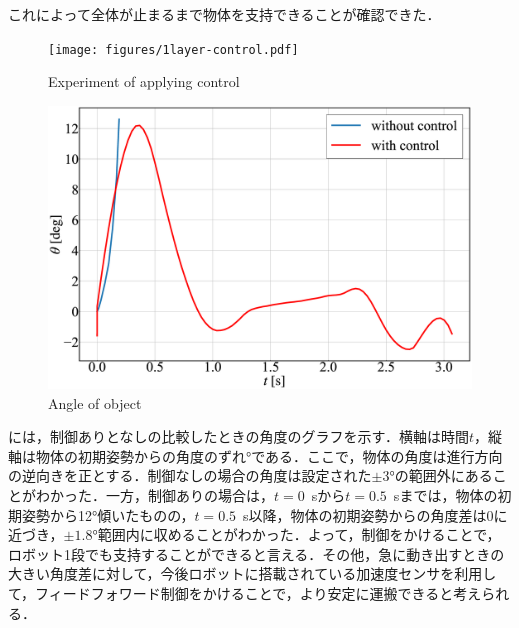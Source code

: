 これによって全体が止まるまで物体を支持できることが確認できた．
\begin{figure}[tb]
  \centering
  \texttt{[image: figures/1layer-control.pdf]}
  \caption{Experiment of applying control}
  \label{fig:control}
\end{figure}
\begin{figure}[tb]
  \centering
  \includegraphics[width=0.8\columnwidth]{figures/angle-control.eps}
  \caption{Angle of object}
  \label{fig:angle}
\end{figure}
には，制御ありとなしの比較したときの角度のグラフを示す．横軸は時間$t$，縦軸は物体の初期姿勢からの角度のずれ\si{\degree}である．ここで，物体の角度は進行方向の逆向きを正とする．制御なしの場合の角度は設定された$\pm3$\si{\degree}の範囲外にあることがわかった．一方，制御ありの場合は，$t=0$~sから$t=0.5$~sまでは，物体の初期姿勢から12\si{\degree}傾いたものの，$t=0.5$~s以降，物体の初期姿勢からの角度差は0に近づき，$\pm1.8$\si{\degree}範囲内に収めることがわかった．よって，制御をかけることで，ロボット1段でも支持することができると言える．その他，急に動き出すときの大きい角度差に対して，今後ロボットに搭載されている加速度センサを利用して，フィードフォワード制御をかけることで，より安定に運搬できると考えられる．